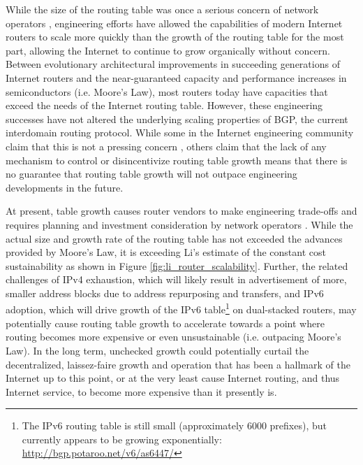 While the size of the routing table was once a serious concern of network
operators \cite{Li:2011vn}, engineering efforts have allowed the capabilities
of modern Internet routers to scale more quickly than the growth of the routing
table for the most part, allowing the Internet to continue to grow organically
without concern. Between evolutionary architectural improvements in succeeding
generations of Internet routers \cite{McKeown:2006kx} and the near-guaranteed
capacity and performance increases in semiconductors (i.e. Moore's Law), most
routers today have capacities that exceed the needs of the Internet routing
table. However, these engineering successes have not altered the underlying
scaling properties of BGP, the current interdomain routing protocol. While some
in the Internet engineering community claim that this is not a pressing concern
\cite{Huston:2011ys, Huston:2009dq}, others \cite{Li:2011vn} claim that the
lack of any mechanism to control or disincentivize routing table growth means
that there is no guarantee that routing table growth will not outpace
engineering developments in the future.

At present, table growth causes router vendors to make engineering trade-offs
\cite{Li:2011vn, Fall:2009fk} and requires planning and investment
consideration by network operators \cite{Zhao:2010fu}. While the actual size
and growth rate of the routing table has not exceeded the advances provided by
Moore's Law, it is exceeding Li's estimate of the constant cost sustainability
as shown in Figure \ref{fig:li_router_scalability}. Further, the related
challenges of IPv4 exhaustion, which will likely result in advertisement of
more, smaller address blocks due to address repurposing and transfers, and IPv6
adoption, which will drive growth of the IPv6 table\footnote{The IPv6 routing
table is still small (approximately 6000 prefixes), but currently appears to be
growing exponentially: \url{http://bgp.potaroo.net/v6/as6447/}} on dual-stacked
routers, may potentially cause routing table growth to accelerate towards a
point where routing becomes more expensive or even unsustainable (i.e.
outpacing Moore's Law). In the long term, unchecked growth could potentially
curtail the decentralized, laissez-faire growth and operation that has been a
hallmark of the Internet up to this point, or at the very least cause Internet
routing, and thus Internet service, to become more expensive than it presently
is.

